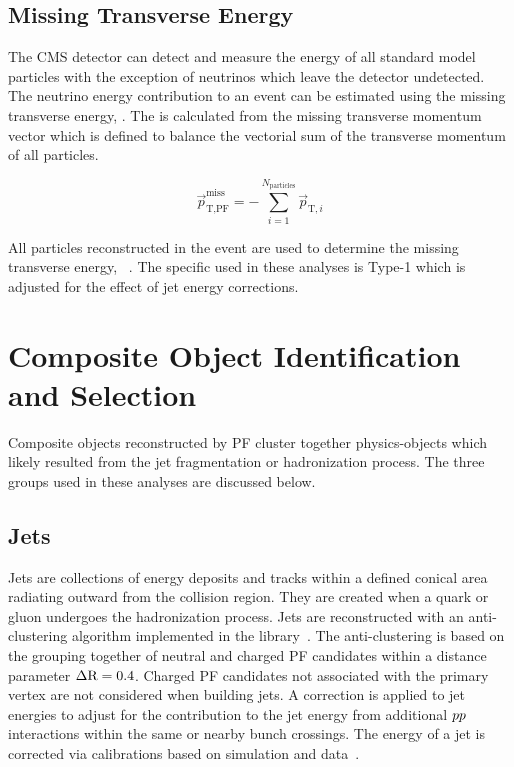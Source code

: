 \subsection{Missing Transverse Energy}
\label{sec:obj_reco_met}
The CMS detector can detect and measure the energy of all standard model particles with the exception
of neutrinos which leave the detector undetected. The neutrino energy contribution to an event can
be estimated using the missing transverse energy, \etvecmiss. The \etvecmiss is calculated from
the missing transverse momentum vector which is defined 
to balance the vectorial sum of the transverse momentum of all particles.

\begin{equation}
\vec{p}^{\text{miss}}_{\text{T,PF}} = - \sum^{N_{\text{particles}}}_{i=1} \vec{p}_{\text{T},i}
\end{equation}

All particles reconstructed in the event are used to determine the missing transverse energy,
\etvecmiss~\cite{Khachatryan:2014gga}. The specific \etvecmiss used in these analyses is Type-1
\etvecmiss which is adjusted for the effect of jet energy corrections.


\section{Composite Object Identification and Selection}
Composite objects reconstructed by PF cluster together physics-objects which likely
resulted from the jet fragmentation or hadronization process. The three groups used in these
analyses are discussed below.

 
\subsection{Jets}
\label{sec:obj_reco_jets}
Jets are collections of energy deposits and tracks within a defined conical area radiating outward
from the collision region. They are created when a quark or gluon undergoes the hadronization process.
Jets are reconstructed with an anti-\kt clustering algorithm implemented in the \FASTJET 
library~\cite{Cacciari:2008gp, Cacciari:2011ma, Cacciari:fastjet2}. The anti-\kt clustering is based on the grouping
together of neutral and charged PF candidates within a distance parameter $\Delta \mathrm{R} = 0.4$. Charged PF 
candidates not associated with the primary vertex are not considered when building jets.
A correction is applied to jet energies to adjust for the contribution to the jet energy from 
additional $pp$ interactions within the same or nearby bunch crossings. The energy of a jet is 
corrected via calibrations based on simulation and data~\cite{CMS-JME-10-011}.


